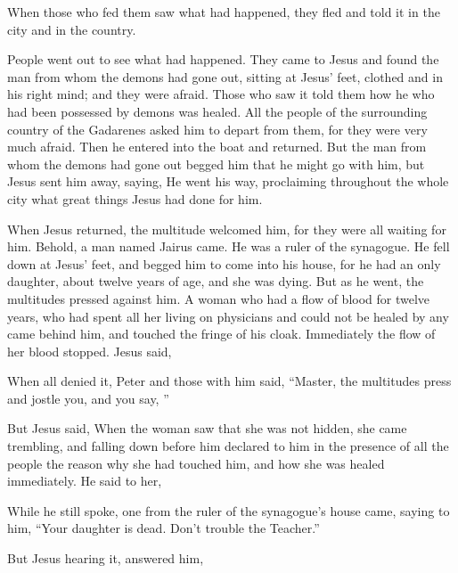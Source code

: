 {When those who fed them saw what had happened, they fled and told it in the city and in the country.
\par }{\PP {}People went out to see what had happened. They came to Jesus and found the man from whom the demons had gone out, sitting at Jesus’ feet, clothed and in his right mind; and they were afraid.
Those who saw it told them how he who had been possessed by demons was healed.
All the people of the surrounding country of the Gadarenes asked him to depart from them, for they were very much afraid. Then he entered into the boat and returned.
But the man from whom the demons had gone out begged him that he might go with him, but Jesus sent him away, saying,
 He went his way, proclaiming throughout the whole city what great things Jesus had done for him.
\par }{\PP {}When Jesus returned, the multitude welcomed him, for they were all waiting for him.
Behold, a man named Jairus came. He was a ruler of the synagogue. He fell down at Jesus’ feet, and begged him to come into his house,
for he had an only daughter, about twelve years of age, and she was dying. But as he went, the multitudes pressed against him.
A woman who had a flow of blood for twelve years, who had spent all her living on physicians and could not be healed by any
came behind him, and touched the fringe of his cloak. Immediately the flow of her blood stopped.
Jesus said,
{}
\par }{\PP When all denied it, Peter and those with him said, “Master, the multitudes press and jostle you, and you say,
{}”
\par }{\PP {}But Jesus said,
{}
When the woman saw that she was not hidden, she came trembling, and falling down before him declared to him in the presence of all the people the reason why she had touched him, and how she was healed immediately.
He said to her,
{}
\par }{\PP {}While he still spoke, one from the ruler of the synagogue’s house came, saying to him, “Your daughter is dead. Don’t trouble the Teacher.”
\par }{\PP {}But Jesus hearing it, answered him,
}
